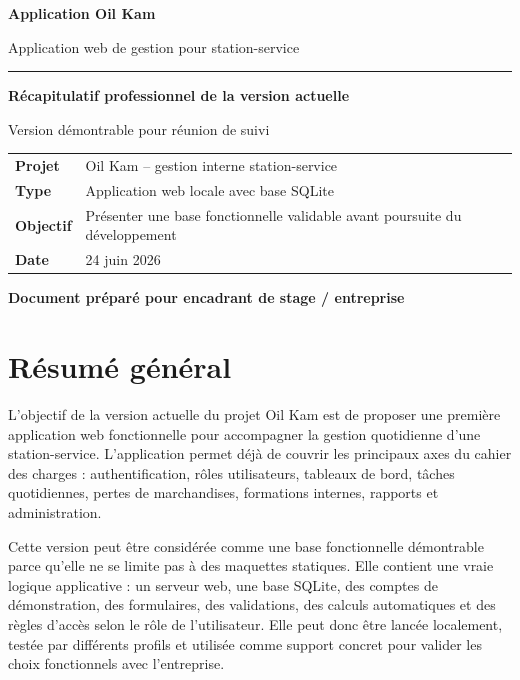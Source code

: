 \documentclass[11pt,a4paper]{article}
\begin{document}
\begin{titlepage}
  \centering
  \vspace*{1.5cm}
  {\Huge\bfseries\color{oildark} Application Oil Kam\par}
  \vspace{0.35cm}
  {\Large Application web de gestion pour station-service\par}
  \vspace{1.2cm}
  \rule{0.8\textwidth}{1pt}
  \vspace{0.8cm}

  {\Large\bfseries Récapitulatif professionnel de la version actuelle\par}
  \vspace{0.4cm}
  {\large Version démontrable pour réunion de suivi\par}

  \vfill
  \begin{tabular}{>{\bfseries}p{4cm}p{8cm}}
    Projet & Oil Kam -- gestion interne station-service \\
    Type & Application web locale avec base SQLite \\
    Objectif & Présenter une base fonctionnelle validable avant poursuite du développement \\
    Date & 24 juin 2026 \\
  \end{tabular}

  \vfill
  {\color{oilgreen}\bfseries Document préparé pour encadrant de stage / entreprise\par}
\end{titlepage}

\tableofcontents
\newpage

\section{Résumé général}

L'objectif de la version actuelle du projet Oil Kam est de proposer une première application web fonctionnelle pour accompagner la gestion quotidienne d'une station-service. L'application permet déjà de couvrir les principaux axes du cahier des charges : authentification, rôles utilisateurs, tableaux de bord, tâches quotidiennes, pertes de marchandises, formations internes, rapports et administration.

Cette version peut être considérée comme une base fonctionnelle démontrable parce qu'elle ne se limite pas à des maquettes statiques. Elle contient une vraie logique applicative : un serveur web, une base SQLite, des comptes de démonstration, des formulaires, des validations, des calculs automatiques et des règles d'accès selon le rôle de l'utilisateur. Elle peut donc être lancée localement, testée par différents profils et utilisée comme support concret pour valider les choix fonctionnels avec l'entreprise.
\end{document}
